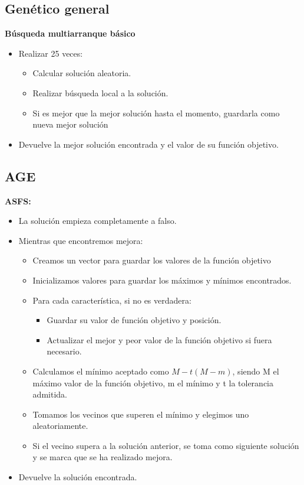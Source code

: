 \subsection{Genético general}
\textbf{Búsqueda multiarranque básico}
\begin{itemize}
\item Realizar 25 veces:
\begin{itemize}
\item Calcular solución aleatoria.
\item Realizar búsqueda local a la solución.
\item Si es mejor que la mejor solución hasta el momento, guardarla como nueva mejor solución
\end{itemize} 
\item Devuelve la mejor solución encontrada y el valor de su función objetivo.
\end{itemize} 
\newpage
\subsection{AGE}
\textbf{ASFS:}
\begin{itemize}
\item La solución empieza completamente a falso.
\item Mientras que encontremos mejora:
\begin{itemize}
\item Creamos un vector para guardar los valores de la función objetivo
\item Inicializamos valores para guardar los máximos y mínimos encontrados.
\item Para cada característica, si no es verdadera:
\begin{itemize}
\item Guardar su valor de función objetivo y posición.
\item Actualizar el mejor y peor valor de la función objetivo si fuera necesario.
\end{itemize}
\item Calculamos el mínimo aceptado como $M-t(M-m)$, siendo M el máximo valor de la función objetivo, m el mínimo y t la tolerancia admitida.
\item Tomamos los vecinos que superen el mínimo y elegimos uno aleatoriamente.
\item Si el vecino supera a la solución anterior, se toma como siguiente solución y se marca que se ha realizado mejora.
\end{itemize}
\item Devuelve la solución encontrada.
\end{itemize}

